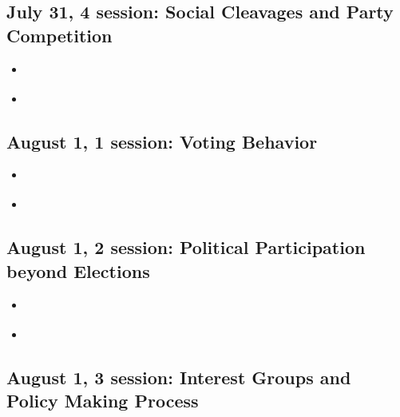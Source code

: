 \documentclass[11p,a4]{article}
\begin{document}
\subsection*{July 31, 4 session: Social Cleavages and Party Competition}				

    \begin{itemize}
       \item \citet[Chapter 6]{grotz2023political} 
        \item \citet{Saalfeld2002}
    \end{itemize}



				
\subsection*{August 1, 1 session: Voting Behavior}

    \begin{itemize}
         \item \citet[Chapter 5]{grotz2023political} 
        \item \citet{hudde2023gender}
    \end{itemize}
				
				
\subsection*{August 1, 2 session: Political Participation beyond Elections}
				
\begin{itemize}
    \item 
\citet{Daphi03072023}
\item \citet{müller-rommel1985}
\end{itemize}
				
\subsection*{August 1, 3 session: Interest Groups and Policy Making Process}				
				
\end{document}
